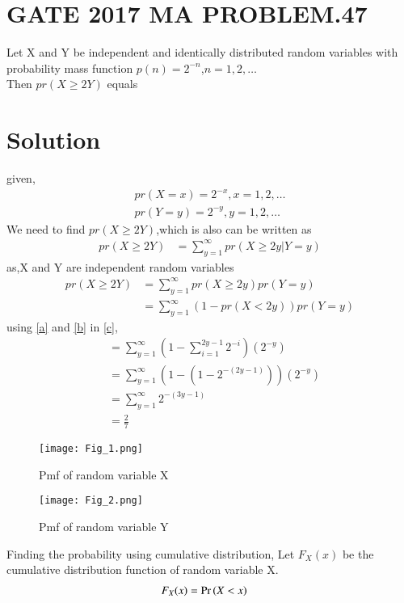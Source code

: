 \documentclass[journal,12pt,twocolumn]{IEEEtran}
\begin{document}
\section{GATE 2017 MA PROBLEM.47 }
Let X and Y be independent and identically distributed random variables with probability mass function $p(n) = 2^{-n}$,$n=1,2,\dots$\\
Then $pr(X\ge 2Y)$ equals 

\section{Solution}
given,\\
\begin{align}
pr(X=x) =2^{-x} ,x=1,2,\dots \label{a}\\
pr(Y=y) =2^{-y} ,y=1,2,\dots \label{b}
\end{align}
We need to find $pr(X\ge 2Y)$,which is also can be written as
\begin{align}
    pr(X\ge 2Y) &=\sum_{y=1}^{\infty}pr(X \ge 2y|Y=y)
\end{align}
as,X and Y are independent random variables
\begin{align}
    pr(X\ge 2Y) &=\sum_{y=1}^{\infty}pr(X \ge 2y)pr(Y=y)\\
               &=\sum_{y=1}^{\infty}(1-pr(X < 2y))pr(Y=y) \label{c}
\end{align}
using \eqref{a} and \eqref{b} in \eqref{c},
\begin{align}
               &=\sum_{y=1}^{\infty}(1- \sum_{i=1}^{2y-1}2^{-i})(2^{-y})\\
               &=\sum_{y=1}^{\infty}(1-(1-2^{-(2y-1)}))(2^{-y})\\
               &=\sum_{y=1}^{\infty}2^{-(3y-1)}\\
               &=\frac{2}{7}
\end{align}
\begin{figure}[ht]
    \centering
    \texttt{[image: Fig\_1.png]}
    \caption{Pmf of random variable X}
    \label{Fig_1}
\end{figure}
\begin{figure}[ht]
    \centering
    \texttt{[image: Fig\_2.png]}
    \caption{Pmf of random variable Y}
    \label{Fig_2}
\end{figure}
Finding the probability using cumulative distribution,
Let $F_X(x)$ be the cumulative distribution function of random variable X.
\begin{align}
    F_X(x)&=\Pr\left(X<x\right)
\end{align}\label{d}
\end{document}

